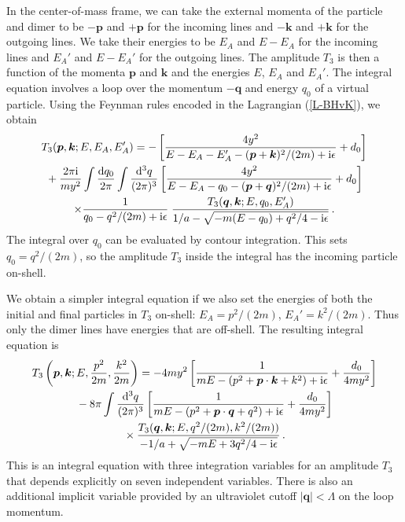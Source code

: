 In the center-of-mass frame, we can take the external momenta of the
particle and dimer to be $-{\bm p}$ and $+{\bm p}$ for the incoming lines
and $-{\bm k}$ and $+{\bm k}$ for the outgoing lines.  We take their
energies to be $E_A$ and $E-E_A$ for the incoming lines and $E_A'$ and
$E-E_A'$ for the outgoing lines. The amplitude $T_3$ is then a
function of the momenta ${\bm p}$ and ${\bm k}$ and the energies $E$,
$E_A$ and $E_A'$. The integral equation involves a loop over the
momentum $-{\bm q}$ and energy ${q_0}$ of a virtual particle. Using the
Feynman rules encoded in the Lagrangian (\ref{L-BHvK}), we obtain
\begin{multline}
 T_3 ({\bm p}, {\bm k}; E, E_A, E_A')
 = {-}\left[ \frac{4y^2}{ E-E_A-E_A' - ({\bm p} + {\bm k})^2 /(2m) + \ii
 \epsilon}
 + {d_0} \right] \\
 \null + \frac{2\pi \ii}{m y^2} \int \frac{\dd q_0}{2 \pi}
 \int\frac{\dd^3q}{(2 \pi)^3}
 \left[ \frac{4 y^2}{E-E_A - q_0 - ({\bm p} + {\bm q})^2/(2m) + \ii\epsilon}
 + {d_0} \right] \\
 \times \frac1{q_0 - q^2/(2m) + \ii \epsilon}\;
 \frac{T_3 ({\bm q}, {\bm k}; E, q_0, E_A')}
 {1/a - \sqrt{-m(E-q_0) + q^2 /4 -\ii \epsilon} } \,.
\end{multline}
The integral over $q_0$ can be evaluated by contour integration. This
sets $q_0 = q^2/(2m)$, so the amplitude $T_3$ inside the integral has the
incoming particle on-shell. 

We obtain a simpler integral
equation if we also set the energies of both the initial and final particles in
$T_3$ on-shell: $E_A = p^2/(2m)$, $E_A' = k^2/(2m)$.
Thus only the dimer lines have energies that are off-shell.
The resulting integral equation is
\begin{multline}
 T_3 \left({\bm p}, {\bm k}; E, \frac{p^2}{2m}, \frac{k^2}{2m}\right)
 = {-}{4my^2} 
 \left[ \frac1{mE - (p^2 + {\bm p} \cdot {\bm k} + k^2) + \ii\epsilon} 
 + \frac{d_0}{4 my^2} \right] \\
 \null - 8 \pi \int\frac{\dd^3q}{(2 \pi)^3}
 \left[ \frac1{mE - (p^2 + {\bm p} \cdot {\bm q} + q^2) + \ii \epsilon}
 + \frac{d_0}{4my^2} \right] \\
 \null\times
 \frac{T_3 ({\bm q}, {\bm k}; E, q^2/(2m), k^2/(2m))}
 {{-}1/a + \sqrt{{-}mE + 3q^2 /4 -\ii \epsilon} } \,.
\label{BhvK:general}
\end{multline}
This is an integral equation with three integration variables 
for an amplitude $T_3$ that depends explicitly 
on seven independent variables.  There is also an additional implicit variable
provided by an  ultraviolet cutoff $|{\bm q}| < \Lambda$
on the loop momentum.

